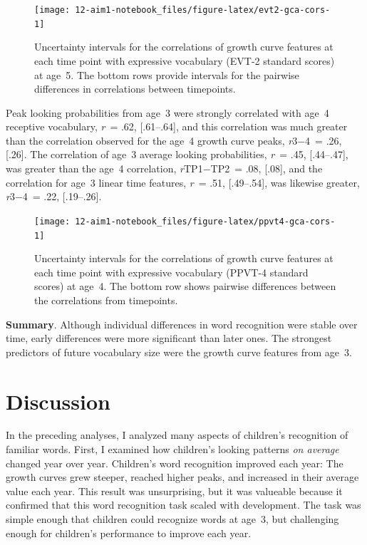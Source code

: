 \documentclass [11pt, proquest] {uwthesis}[2015/03/03]
\begin{document}
\begin{figure}
\texttt{[image: 12-aim1-notebook\_files/figure-latex/evt2-gca-cors-1]} \caption{Uncertainty intervals for the correlations of growth
curve features at each time point with expressive vocabulary (EVT-2
standard scores) at age~5. The bottom rows provide intervals for the
pairwise differences in correlations between timepoints.}\label{fig:evt2-gca-cors}
\end{figure}
Peak looking probabilities from age~3 were strongly correlated with
age~4 receptive vocabulary, \emph{r}~= .62, {[}.61--.64{]}, and this
correlation was much greater than the correlation observed for the age~4
growth curve peaks, \emph{r}3−4~= .26, {[}.26{]}. The correlation of
age~3 average looking probabilities, \emph{r}~= .45, {[}.44--.47{]}, was
greater than the age~4 correlation, \emph{r}TP1−TP2~= .08, {[}.08{]},
and the correlation for age~3 linear time features, \emph{r}~= .51,
{[}.49--.54{]}, was likewise greater, \emph{r}3−4~= .22, {[}.19--.26{]}.





\begin{figure}
\texttt{[image: 12-aim1-notebook\_files/figure-latex/ppvt4-gca-cors-1]} \caption{Uncertainty intervals for the correlations of
growth curve features at each time point with expressive vocabulary
(PPVT-4 standard scores) at age~4. The bottom row shows pairwise
differences between the correlations from timepoints.}\label{fig:ppvt4-gca-cors}
\end{figure}
\textbf{Summary}. Although individual differences in word recognition
were stable over time, early differences were more significant than
later ones. The strongest predictors of future vocabulary size were the
growth curve features from age~3.

\section{Discussion}\label{discussion}

In the preceding analyses, I analyzed many aspects of children's
recognition of familiar words. First, I examined how children's looking
patterns \emph{on average} changed year over year. Children's word
recognition improved each year: The growth curves grew steeper, reached
higher peaks, and increased in their average value each year. This
result was unsurprising, but it was valueable because it confirmed that
this word recognition task scaled with development. The task was simple
enough that children could recognize words at age~3, but challenging
enough for children's performance to improve each year.
\end{document}
